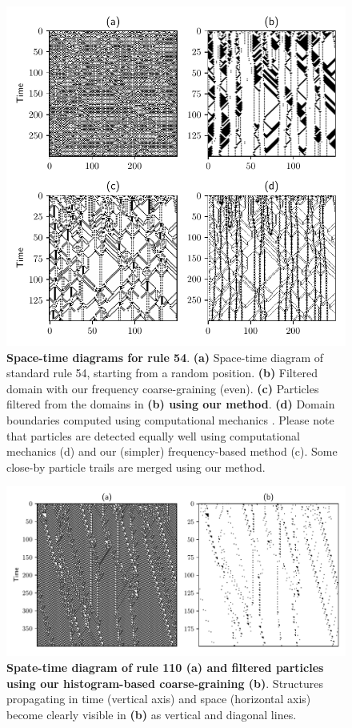 \begin{figure}[th]
  \centering
  \includegraphics[width=\linewidth]{figures/rule54.pdf}
  \caption{\label{fig:rule54} \textbf{Space-time diagrams for rule 54}.
    \textbf{(a)} Space-time diagram of standard rule 54, starting from a random
    position. \textbf{(b)} Filtered domain with our frequency coarse-graining
    (even). \textbf{(c)} Particles filtered from the domains in \textbf{(b)
      using our method}. \textbf{(d)} Domain boundaries computed using
    computational mechanics \cite{hansonComputationalMechanicsCellular1997}.
    Please note that particles are detected equally well using computational
    mechanics (d) and our (simpler) frequency-based method (c). Some close-by
    particle trails are merged using our method.}
\end{figure}

\begin{figure}[t]
  \centering
  \includegraphics[width=\linewidth]{figures/rule110.pdf}
  \caption{\label{fig:rule110} \textbf{Spate-time diagram of rule 110 (\textbf{a})
      and filtered particles using our histogram-based coarse-graining
      (\textbf{b})}. Structures propagating in time (vertical axis) and space
    (horizontal axis) become clearly visible in \textbf{(b)} as vertical and
    diagonal lines.
    }
\end{figure}
